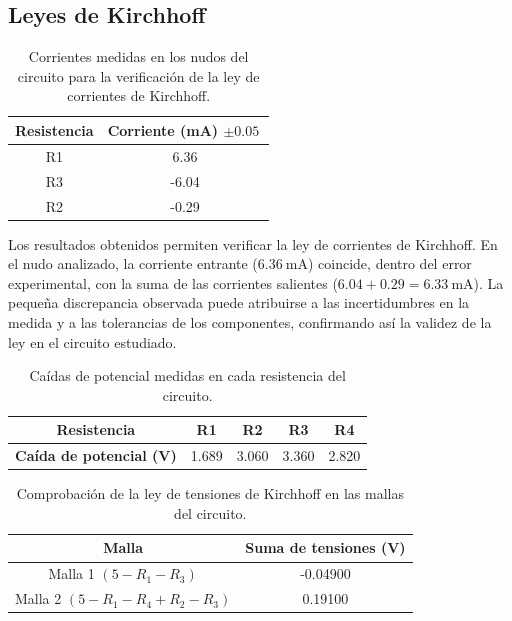 \documentclass[a4paper,12pt]{article}
\begin{document}
\subsection{Leyes de Kirchhoff}



\begin{table}[h]
    \centering
    \begin{tabular}{|c|c|}
        \hline
        \textbf{Resistencia} & \textbf{Corriente (mA)} $\pm \SI{0.05}{}$ \\
        \hline
        R1 & 6.36 \\
        \hline
        R3 & -6.04 \\
        \hline
        R2 & -0.29 \\
        \hline
    \end{tabular}
    \caption{Corrientes medidas en los nudos del circuito para la verificación de la ley de corrientes de Kirchhoff.}
    \label{tab:kirchhoff_nudos_corriente}
\end{table}



Los resultados obtenidos permiten verificar la ley de corrientes de Kirchhoff. En el nudo analizado, la corriente entrante ($6.36\ \text{mA}$) coincide, dentro del error experimental, con la suma de las corrientes salientes ($6.04 + 0.29 = 6.33\ \text{mA}$). La pequeña discrepancia observada puede atribuirse a las incertidumbres en la medida y a las tolerancias de los componentes, confirmando así la validez de la ley en el circuito estudiado.
\begin{table}[h]
    \centering
    \begin{tabular}{|c|S|S|S|S|}
        \hline
        \textbf{Resistencia} & {R1} & {R2} & {R3} & {R4} \\
        \hline
        {\textbf{Caída de potencial (V)}} & 1.689 & 3.060 & 3.360 & 2.820 \\
        \hline
    \end{tabular}
    \caption{Caídas de potencial medidas en cada resistencia del circuito.}
    \label{tab:kirchhoff_voltajes}
\end{table}

\begin{table}[h]
    \centering
    \begin{tabular}{|c|c|}
        \hline
        \textbf{Malla} & \textbf{Suma de tensiones (V)} \\
        \hline
        Malla 1 $(5 - R_1 - R_3)$ & -0.04900 \\
        \hline
        Malla 2 $(5 - R_1 - R_4 + R_2 - R_3)$ & 0.19100 \\
        \hline
    \end{tabular}
    \caption{Comprobación de la ley de tensiones de Kirchhoff en las mallas del circuito.}
    \label{tab:kirchhoff_mallas}
\end{table}
\end{document}
